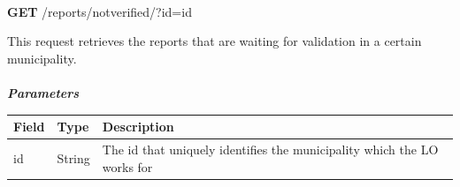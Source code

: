						\paragraph{}
						\textbf{GET} /reports/notverified/?id={id}
						
						This request retrieves the reports that are waiting for validation in a certain municipality.
						\paragraph{}
							\textit{\textbf{Parameters}}
							\vspace{-2mm}
							\begin{table}[!h]
								\begin{tabular}{L{0.2\textwidth}L{0.2\textwidth}L{0.4\textwidth}}
									\toprule
									\textbf{Field} & \textbf{Type} & \textbf{Description} \\
									\midrule
								 	id & String & The id that uniquely identifies the municipality which the LO works for \\
								 	\bottomrule
								\end{tabular}
							\end{table}
